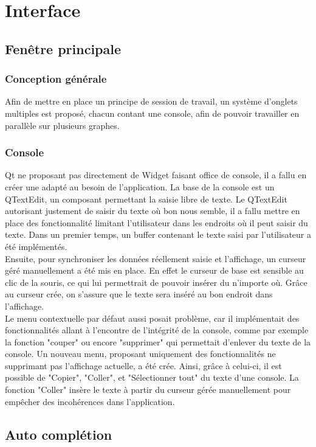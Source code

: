 \documentclass[french]{article}
\begin{document}
	\section{Interface}
		\subsection{Fenêtre principale}
			\subsubsection{Conception générale}
				Afin de mettre en place un principe de session de travail, un système d'onglets multiples est proposé, chacun contant une console, afin de pouvoir travailler en parallèle sur plusieurs graphes.
			\subsubsection{Console}
				Qt ne proposant pas directement de Widget faisant office de console, il a fallu en créer une adapté au besoin de l'application. La base de la console est un QTextEdit, un composant permettant la saisie libre de texte. Le QTextEdit autorisant justement de saisir du texte où bon nous semble, il a fallu mettre en place des fonctionnalité limitant l'utilisateur dans les endroits où il peut saisir du texte. Dans un premier temps, un buffer contenant le texte saisi par l'utilisateur a été implémentés.\\
				Ensuite, pour synchroniser les données réellement saisie et l'affichage, un curseur géré manuellement a été mis en place. En effet le curseur de base est sensible au clic de la souris, ce qui lui permettrait de pouvoir insérer du n'importe où. Grâce au curseur crée, on s'assure que le texte sera inséré au bon endroit dans l'affichage.\\
				Le menu contextuelle par défaut aussi posait problème, car il implémentait des fonctionnalités allant à l'encontre de l'intégrité de la console, comme par exemple la fonction "couper" ou encore "supprimer" qui permettait d'enlever du texte de la console. Un nouveau menu, proposant uniquement des fonctionnalités ne supprimant pas l'affichage actuelle, a été crée. Ainsi, grâce à celui-ci, il est possible de "Copier", "Coller", et "Sélectionner tout" du texte d'une console. La fonction "Coller" insère le texte à partir du curseur gérée manuellement pour empêcher des incohérences dans l'application.
		\subsection{Auto complétion}
\end{document}
